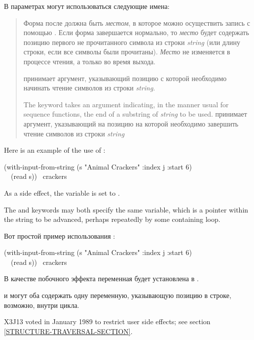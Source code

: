 \begin{defmac}
В параметрах могут использоваться следующие имена:
\begin{quotation}
\begin{flushdesc}
\item[\cd{:index}]
Форма после  должна быть \emph{местом}, в которое можно осуществить
запись с помощью . Если форма  завершается
нормально, то \emph{место} будет содержать позицию первого не прочитанного
символа из строки \emph{string} (или длину строки, если все символы были
прочитаны).
\emph{Место} не изменяется в процессе чтения, а только во время выхода.

\item[\cd{:start}]
 принимает аргумент, указывающий позицию с которой
необходимо начинать чтение символов из строки \emph{string}.

\item[\cd{:end}]
The  keyword takes an argument indicating, in the manner
usual for sequence functions, the end of
a substring of \emph{string} to be used.
 принимает аргумент, указывающий на позицию на которой необходимо
завершить чтение символов из строки \emph{string}

\end{flushdesc}
\end{quotation}

Here is an example of the use of :
\begin{lisp}
(with-input-from-string (s "Animal Crackers" :index j :start 6) \\
~~(read s)) \EV\ crackers
\end{lisp}
As a side effect, the variable  is set to .

The  and  keywords may both specify
the same variable, which is a pointer within the string to be advanced,
perhaps repeatedly by some containing loop.

Вот простой пример использования :
\begin{lisp}
(with-input-from-string (s "Animal Crackers" :index j :start 6) \\
~~(read s)) \EV\ crackers
\end{lisp}
В качестве побочного эффекта переменная  будет установлена в .

 и  могут оба содержать одну переменную, указывающую
позицию в строке, возможно, внутри цикла.

\begin{new}
X3J13 voted in January 1989
to restrict user side effects; see section \ref{STRUCTURE-TRAVERSAL-SECTION}.
\end{new}
\end{defmac}

